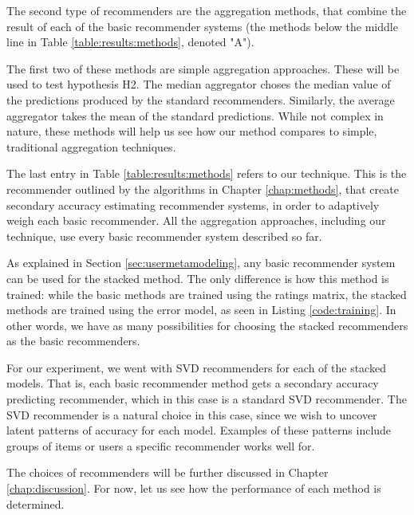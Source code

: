 The second type of recommenders are the aggregation methods, 
that combine the result of each of the basic recommender systems
(the methods below the middle line in Table \ref{table:results:methods},
denoted "A").

The first two of these methods are simple aggregation approaches.
These will be used to test hypothesis H2.
The median aggregator choses the median value of the predictions
produced by the standard recommenders.
Similarly, the average aggregator takes the mean of the
standard predictions.
While not complex in nature, these methods
will help us see how our method compares to simple, traditional
aggregation techniques.

The last entry in Table \ref{table:results:methods}
refers to our technique. 
This is the recommender outlined by the algorithms
in Chapter \ref{chap:methods},
that create secondary accuracy estimating recommender systems,
in order to adaptively weigh each basic recommender.
All the aggregation approaches, including our technique,
use every basic recommender system described so far.

As explained in Section \ref{sec:usermetamodeling},
any basic recommender system can be used for the stacked method.
The only difference is how this method is trained:
while the basic methods are trained using the ratings matrix,
the stacked methods are trained using the error model,
as seen in Listing \ref{code:training}.
In other words, we have as many possibilities for choosing
the stacked recommenders as the basic recommenders.

For our experiment, we went with SVD recommenders
for each of the stacked models.
That is, each basic recommender method gets a secondary 
accuracy predicting recommender, which in this case is a 
standard SVD recommender.
The SVD recommender is a natural choice in this case,
since we wish to uncover latent patterns of accuracy
for each model.
Examples of these patterns include groups of items
or users a specific recommender works well for.

The choices of recommenders will be further discussed
in Chapter \ref{chap:discussion}.
For now, let us see how the performance of each method is determined.


